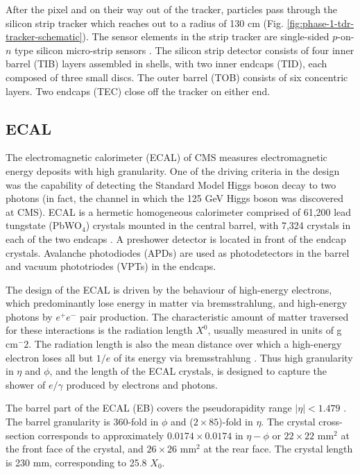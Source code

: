 After the pixel and on their way out of the tracker, particles pass through the silicon strip tracker which reaches out to a radius of 130 cm (Fig. \ref{fig:phase-1-tdr-tracker-schematic}). The sensor elements in the strip tracker are single-sided $p$-on-$n$ type silicon micro-strip sensors \cite{CMS-2008-JINST-3-S08004}. The silicon strip detector consists of four inner barrel (TIB) layers assembled in shells, with two inner endcaps (TID), each composed of three small discs. The outer barrel (TOB) consists of six concentric layers. Two endcaps (TEC) close off the tracker on either end. 


\subsection{ECAL} 
The electromagnetic calorimeter (ECAL) of CMS measures electromagnetic energy deposits with high granularity. One of the driving criteria in the design was the capability of detecting the Standard Model Higgs boson decay to two photons (in fact, the channel in which the 125 GeV Higgs boson was discovered at CMS). 
ECAL is a hermetic homogeneous calorimeter comprised of 61,200 lead tungstate (PbWO$_4$) crystals mounted in the central barrel, with 7,324 crystals in each of the two endcaps \cite{CMS-2008-JINST-3-S08004}. A preshower detector is located in front of the endcap crystals. Avalanche photodiodes (APDs) are used as photodetectors in the barrel and vacuum phototriodes (VPTs) in the endcaps. 

The design of the ECAL is driven by the behaviour of high-energy electrons, which predominantly lose energy in matter via bremsstrahlung, and high-energy photons by $e^+ e^-$ pair production. The characteristic amount of matter traversed for these interactions is the radiation length $X^0$, usually measured in units of g cm$^-2$. The radiation length is also the mean distance over which a high-energy electron loses all but $1/e$ of its energy via bremsstrahlung \cite{workman_review_2022}. Thus high granularity in $\eta$ and $\phi$, and the length of the ECAL crystals, is designed to capture the shower of $e/\gamma$ produced by electrons and photons.

The barrel part of the ECAL (EB) covers the pseudorapidity range $|\eta| < 1.479$ \cite{CMS-2008-JINST-3-S08004}. The barrel granularity is 360-fold in $\phi$ and ($2 \times 85$)-fold in $\eta$. The crystal cross-section corresponds to approximately $0.0174 \times 0.0174$ in $\eta-\phi$ or $22 \times 22$ mm$^2$ at the front face of the crystal, and $26 \times 26$ mm$^2$ at the rear face. The crystal length is 230 mm, corresponding to 25.8 $X_0$.

